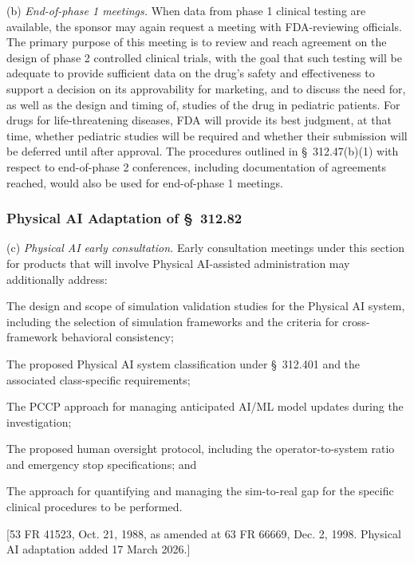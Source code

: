(b) \textit{End-of-phase 1 meetings.} When data from phase 1 clinical testing are available, the sponsor may again request a meeting with FDA-reviewing officials. The primary purpose of this meeting is to review and reach agreement on the design of phase 2 controlled clinical trials, with the goal that such testing will be adequate to provide sufficient data on the drug's safety and effectiveness to support a decision on its approvability for marketing, and to discuss the need for, as well as the design and timing of, studies of the drug in pediatric patients. For drugs for life-threatening diseases, FDA will provide its best judgment, at that time, whether pediatric studies will be required and whether their submission will be deferred until after approval. The procedures outlined in \S~312.47(b)(1) with respect to end-of-phase 2 conferences, including documentation of agreements reached, would also be used for end-of-phase 1 meetings.

\subsubsection{Physical AI Adaptation of \S~312.82}

(c) \textit{Physical AI early consultation.} Early consultation meetings under this section for products that will involve Physical AI-assisted administration may additionally address:

\begin{description}[leftmargin=0.8cm,style=sameline]
\item[(i)] The design and scope of simulation validation studies for the Physical AI system, including the selection of simulation frameworks and the criteria for cross-framework behavioral consistency;
\item[(ii)] The proposed Physical AI system classification under \S~312.401 and the associated class-specific requirements;
\item[(iii)] The PCCP approach for managing anticipated AI/ML model updates during the investigation;
\item[(iv)] The proposed human oversight protocol, including the operator-to-system ratio and emergency stop specifications; and
\item[(v)] The approach for quantifying and managing the sim-to-real gap for the specific clinical procedures to be performed.
\end{description}

[53 FR 41523, Oct. 21, 1988, as amended at 63 FR 66669, Dec. 2, 1998. Physical AI adaptation added 17 March 2026.]

